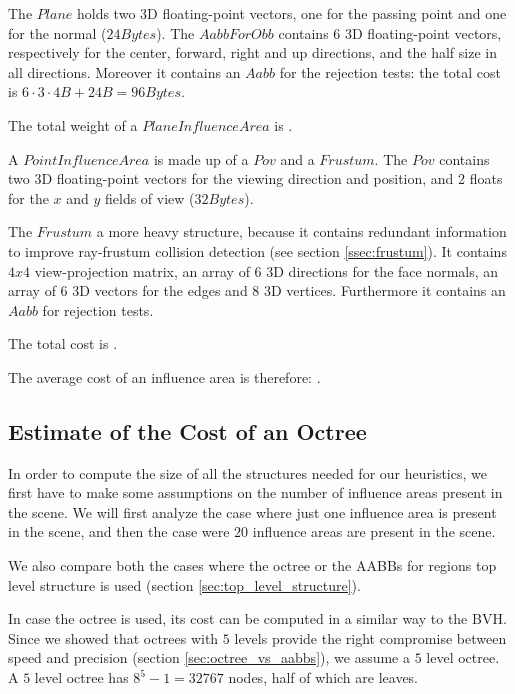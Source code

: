 \documentclass{PoliMi_MasterThesis}
\begin{document}
The $Plane$ holds two 3D floating-point vectors, one for the passing point and one for the normal ($24 Bytes$). The $AabbForObb$ contains $6$ 3D floating-point vectors, respectively for the center, forward, right and up directions, and the half size in all directions. Moreover it contains an $Aabb$ for the rejection tests: the total cost is $6 \cdot 3 \cdot 4B + 24B= 96 Bytes$.

The total weight of a $PlaneInfluenceArea$ is \unboldmath.

A $PointInfluenceArea$ is made up of a $Pov$ and a $Frustum$. The $Pov$ contains two 3D floating-point vectors for the viewing direction and position, and 2 floats for the $x$ and $y$ fields of view ($32 Bytes$).

The $Frustum$ a more heavy structure, because it contains redundant information to improve ray-frustum collision detection (see section \ref{ssec:frustum}). It contains $4x4$ view-projection matrix, an array of $6$ 3D directions for the face normals, an array of $6$ 3D vectors for the edges and $8$ 3D vertices. Furthermore it contains an $Aabb$ for rejection tests. 

The total cost is \unboldmath.

The average cost of an influence area is therefore: \unboldmath.

\subsection*{Estimate of the Cost of an Octree}
In order to compute the size of all the structures needed for our heuristics, we first have to make some assumptions on the number of influence areas present in the scene. We will first analyze the case where just one influence area is present in the scene, and then the case were $20$ influence areas are present in the scene.

We also compare both the cases where the octree or the AABBs for regions top level structure is used (section \ref{sec:top_level_structure}).

In case the octree is used, its cost can be computed in a similar way to the BVH. Since we showed that octrees with $5$ levels provide the right compromise between speed and precision (section \ref{sec:octree_vs_aabbs}), we assume a $5$ level octree. A $5$ level octree has $8^{5}-1 = 32767$ nodes, half of which are leaves.
\end{document}
